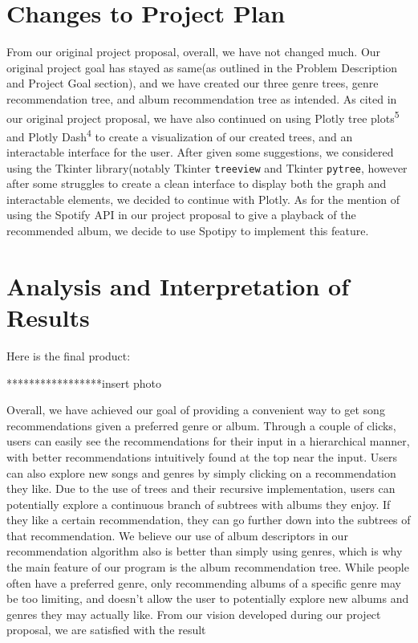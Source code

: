 \documentclass[fontsize=11pt]{article}
\begin{document}
\section*{Changes to Project Plan}

From our original project proposal, overall, we have not changed much. Our original project goal has stayed as same(as outlined in the Problem Description and Project Goal section), and we have created our three genre trees, genre recommendation tree, and album recommendation tree as intended. As cited in our original project proposal, we have also continued on using Plotly tree plots\textsuperscript{5} and Plotly Dash\textsuperscript{4} to create a visualization of our created trees, and an interactable interface for the user. After given some suggestions, we considered using the Tkinter library(notably Tkinter \texttt{treeview} and Tkinter \texttt{pytree}, however after some struggles to create a clean interface to display both the graph and interactable elements, we decided to continue with Plotly. As for the mention of using the Spotify API in our project proposal to give a playback of the recommended album, we decide to use Spotipy to implement this feature. 

\section*{Analysis and Interpretation of Results}

Here is the final product: \newline

*****************insert photo \newline 

Overall, we have achieved our goal of providing a convenient way to get song recommendations given a preferred genre or album. Through a couple of clicks, users can easily see the recommendations for their input in a hierarchical manner, with better recommendations intuitively found at the top near the input. Users can also explore new songs and genres by simply clicking on a recommendation they like. Due to the use of trees and their recursive implementation, users can potentially explore a continuous branch of subtrees with albums they enjoy. If they like a certain recommendation, they can go further down into the subtrees of that recommendation. We believe our use of album descriptors in our recommendation algorithm also is better than simply using genres, which is why the main feature of our program is the album recommendation tree. While people often have a preferred genre, only recommending albums of a specific genre may be too limiting, and doesn't allow the user to potentially explore new albums and genres they may actually like. From our vision developed during our project proposal, we are satisfied with the result \newline
\end{document}
